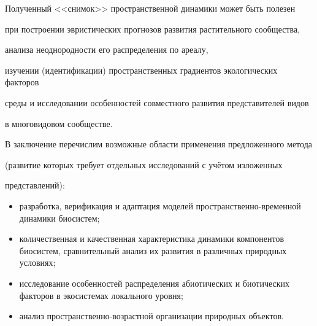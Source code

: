 Полученный <<снимок>> пространственной динамики может быть полезен 

при построении эвристических прогнозов развития растительного сообщества, 

анализа неоднородности его распределения по ареалу, 

изучении (идентификации) пространственных градиентов экологических факторов 

среды и исследовании особенностей совместного развития представителей видов 

в многовидовом сообществе.



В заключение перечислим возможные области применения предложенного метода 

(развитие которых требует отдельных исследований с учётом изложенных 

представлений):

\begin{itemize}

\item[--] разработка, верификация и адаптация моделей про\-стран\-ствен\-но-вре\-мен\-ной динамики биосистем; 


\item[--] количественная и качественная характеристика динамики компонентов биосистем, сравнительный анализ их развития в различных природных условиях;

\item[--] исследование особенностей распределения абиотических и биотических факторов в  экосистемах локального уровня;

\item[--] анализ про\-странствен\-но-воз\-раст\-ной организации природных объектов.

\end{itemize}










